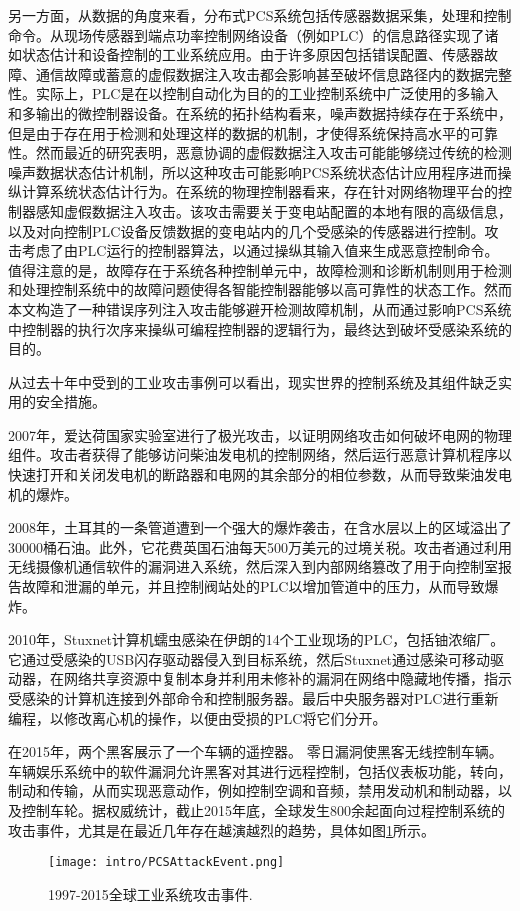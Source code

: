 另一方面，从数据的角度来看，分布式PCS系统包括传感器数据采集，处理和控制命令。从现场传感器到端点功率控制网络设备（例如PLC）的信息路径实现了诸如状态估计和设备控制的工业系统应用。由于许多原因包括错误配置、传感器故障、通信故障或蓄意的虚假数据注入攻击都会影响甚至破坏信息路径内的数据完整性。实际上，PLC是在以控制自动化为目的的工业控制系统中广泛使用的多输入和多输出的微控制器设备。在系统的拓扑结构看来，噪声数据持续存在于系统中，但是由于存在用于检测和处理这样的数据的机制，才使得系统保持高水平的可靠性。然而最近的研究\parencite{Liu11,Zonouz12}表明，恶意协调的虚假数据注入攻击可能能够绕过传统的检测噪声数据状态估计机制，所以这种攻击可能影响PCS系统状态估计应用程序进而操纵计算系统状态估计行为\parencite{Liu092,Teixeira12,Xie11}。在系统的物理控制器看来，存在针对网络物理平台的控制器感知虚假数据注入攻击。该攻击需要关于变电站配置的本地有限的高级信息，以及对向控制PLC设备反馈数据的变电站内的几个受感染的传感器进行控制。攻击考虑了由PLC运行的控制器算法，以通过操纵其输入值来生成恶意控制命令。值得注意的是，故障存在于系统各种控制单元中，故障检测和诊断机制则用于检测和处理控制系统中的故障问题使得各智能控制器能够以高可靠性的状态工作。然而本文构造了一种错误序列注入攻击能够避开检测故障机制，从而通过影响PCS系统中控制器的执行次序来操纵可编程控制器的逻辑行为，最终达到破坏受感染系统的目的。

从过去十年中受到的工业攻击事例可以看出，现实世界的控制系统及其组件缺乏实用的安全措施。

2007年，爱达荷国家实验室进行了极光攻击，以证明网络攻击如何破坏电网的物理组件\parencite{Meserve072}。攻击者获得了能够访问柴油发电机的控制网络，然后运行恶意计算机程序以快速打开和关闭发电机的断路器和电网的其余部分的相位参数，从而导致柴油发电机的爆炸。

2008年，土耳其的一条管道遭到一个强大的爆炸袭击，在含水层以上的区域溢出了30000桶石油。此外，它花费英国石油每天500万美元的过境关税。攻击者通过利用无线摄像机通信软件的漏洞进入系统，然后深入到内部网络篡改了用于向控制室报告故障和泄漏的单元，并且控制阀站处的PLC以增加管道中的压力，从而导致爆炸。

2010年，Stuxnet计算机蠕虫感染在伊朗的14个工业现场的PLC，包括铀浓缩厂\parencite{Kushner07,Chen11}。它通过受感染的USB闪存驱动器侵入到目标系统，然后Stuxnet通过感染可移动驱动器，在网络共享资源中复制本身并利用未修补的漏洞在网络中隐藏地传播，指示受感染的计算机连接到外部命令和控制服务器。最后中央服务器对PLC进行重新编程，以修改离心机的操作，以便由受损的PLC将它们分开\parencite{Line14}。

在2015年，两个黑客展示了一个车辆的遥控器\parencite{Miller15}。 零日漏洞使黑客无线控制车辆。车辆娱乐系统中的软件漏洞允许黑客对其进行远程控制，包括仪表板功能，转向，制动和传输，从而实现恶意动作，例如控制空调和音频，禁用发动机和制动器，以及控制车轮\parencite{Thomas15}。据权威统计，截止2015年底，全球发生800余起面向过程控制系统的攻击事件，尤其是在最近几年存在越演越烈的趋势，具体如图\ref{pcsattack}所示。
\begin{figure}[!htp]
 \centering
 \texttt{[image: intro/PCSAttackEvent.png]}
 \caption{1997-2015全球工业系统攻击事件.}
 \label{pcsattack}
\end{figure}


